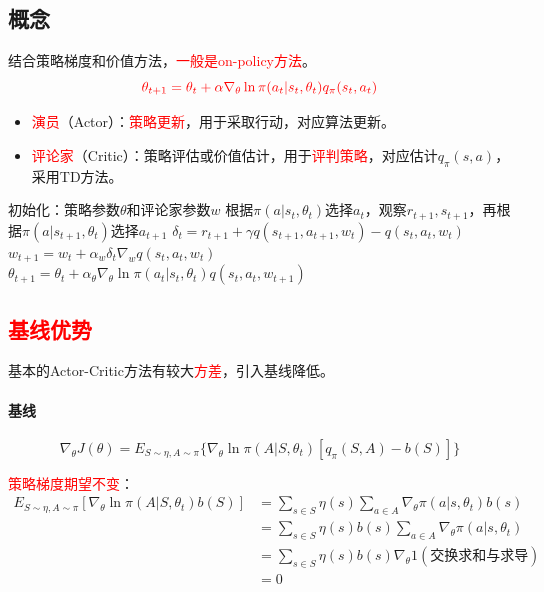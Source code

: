 \documentclass[
12pt, %
a4paper, 
oneside, %
]{scrartcl}
\begin{document}
\subsection[概念]{概念}
结合策略梯度和价值方法，\textcolor{red}{一般是on-policy方法}。
$$ \textcolor{red}{\theta_{t + 1} = \theta_t + \alpha \nabla_\theta \ln \pi(a_t|s_t, \theta_t) q_\pi(s_t, a_t)} $$
\begin{itemize}
\item \textcolor{red}{演员}（Actor）：\textcolor{red}{策略更新}，用于采取行动，对应算法更新。
\item \textcolor{red}{评论家}（Critic）：策略评估或价值估计，用于\textcolor{red}{评判策略}，对应估计$ q_{\pi}(s, a) $，采用TD方法。
\end{itemize}
\begin{myalgorithm}[QAC]
\State 初始化：策略参数$ \theta $和评论家参数$ w $
\State 根据$ \pi(a|s_t, \theta_t) $选择$ a_t $，观察$ r_{t + 1}, s_{t + 1} $，再根据$ \pi(a|s_{t + 1}, \theta_t) $选择$ a_{t + 1} $
\State $ \delta_t = r_{t + 1} + \gamma q(s_{t + 1}, a_{t + 1}, w_t) - q(s_t, a_t, w_t) $ 
\State $ w_{t + 1} = w_t + \alpha_w \delta_t \nabla_w q(s_t, a_t, w_t) $ 
\State $ \theta_{t + 1} = \theta_t + \alpha_\theta \nabla_\theta \ln \pi(a_t|s_t, \theta_t) q(s_t, a_t, w_{t + 1}) $ 
\EndFor
\EndFor
\end{myalgorithm}
\subsection[基线优势]{\textcolor{red}{基线优势}}
基本的Actor-Critic方法有较大\textcolor{red}{方差}，引入基线降低。
\paragraph{基线}
$$ \nabla_\theta J(\theta) = E_{S \sim \eta, A \sim \pi}\{\nabla_\theta \ln \pi(A|S, \theta_t) [q_\pi(S, A) - b(S)]\} $$

\textcolor{red}{策略梯度期望不变}：
\begin{align*}
E_{S \sim \eta, A \sim \pi}[\nabla_\theta \ln \pi(A|S, \theta_t)b(S)] &= \sum_{s \in S} \eta(s) \sum_{a \in A} \nabla_\theta \pi(a|s, \theta_t)b(s) \\
&= \sum_{s \in S} \eta(s) b(s) \sum_{a \in A} \nabla_\theta \pi(a|s, \theta_t) \\
&= \sum_{s \in S} \eta(s) b(s) \nabla_\theta 1 (\text{交换求和与求导}) \\
&= 0
\end{align*}
\end{document}
